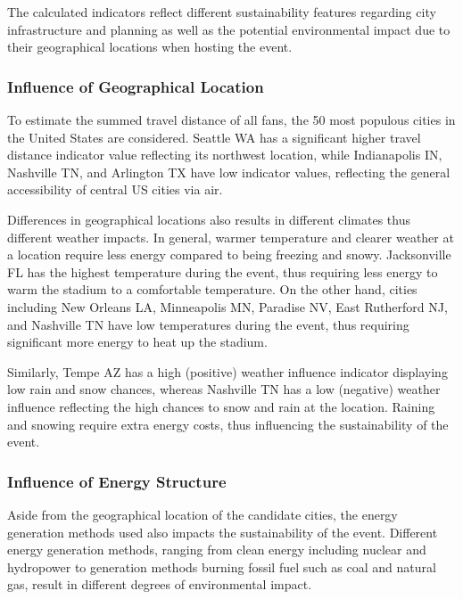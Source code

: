 \documentclass{mcmthesis}
\begin{document}
The calculated indicators reflect different sustainability features regarding city infrastructure and planning as well as the potential environmental impact due to their geographical locations when hosting the event. %


\subsubsection{Influence of Geographical Location} \label{subsubsec:indicator_insights_location}

To estimate the summed travel distance of all fans, the 50 most populous cities in the United States are considered. Seattle WA has a significant higher travel distance indicator value reflecting its northwest location, while Indianapolis IN, Nashville TN, and Arlington TX have low indicator values, reflecting the general accessibility of central US cities via air. 

Differences in geographical locations also results in different climates thus different weather impacts. In general, warmer temperature and clearer weather at a location require less energy compared to being freezing and snowy. Jacksonville FL has the highest temperature during the event, thus requiring less energy to warm the stadium to a comfortable temperature. On the other hand, cities including New Orleans LA, Minneapolis MN, Paradise NV, East Rutherford NJ, and Nashville TN have low temperatures during the event, thus requiring significant more energy to heat up the stadium.

Similarly, Tempe AZ has a high (positive) weather influence indicator displaying low rain and snow chances, whereas Nashville TN has a low (negative) weather influence reflecting the high chances to snow and rain at the location. Raining and snowing require extra energy costs, thus influencing the sustainability of the event. 

\subsubsection{Influence of Energy Structure} \label{subsubsec:indicator_insights_energy}

Aside from the geographical location of the candidate cities, the energy generation methods used also impacts the sustainability of the event. Different energy generation methods, ranging from clean energy including nuclear and hydropower to generation methods burning fossil fuel such as coal and natural gas, result in different degrees of environmental impact. 
\end{document}
